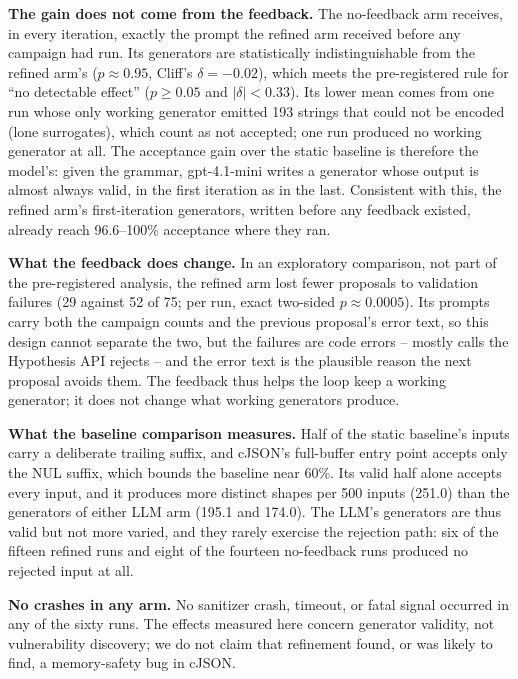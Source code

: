 \textbf{The gain does not come from the feedback.} The no-feedback arm
receives, in every iteration, exactly the prompt the refined arm received
before any campaign had run. Its generators are statistically
indistinguishable from the refined arm's ($p \approx 0.95$, Cliff's
$\delta = -0.02$), which meets the pre-registered rule for ``no detectable
effect'' ($p \geq 0.05$ and $|\delta| < 0.33$). Its lower mean comes from
one run whose only working generator emitted 193 strings that could not be
encoded (lone surrogates), which count as not accepted; one run produced no
working generator at all. The acceptance gain over the static baseline is
therefore the model's: given the grammar, gpt-4.1-mini writes a generator
whose output is almost always valid, in the first iteration as in the last.
Consistent with this, the refined arm's first-iteration generators, written
before any feedback existed, already reach 96.6--100\% acceptance where they
ran.

\textbf{What the feedback does change.} In an exploratory comparison, not
part of the pre-registered analysis, the refined arm lost fewer proposals
to validation failures (29 against 52 of 75; per run, exact two-sided
$p \approx 0.0005$). Its prompts carry both the campaign counts and the
previous proposal's error text, so this design cannot separate the two, but
the failures are code errors -- mostly calls the Hypothesis API rejects --
and the error text is the plausible reason the next proposal avoids them.
The feedback thus helps the loop keep a working generator; it does not
change what working generators produce.

\textbf{What the baseline comparison measures.} Half of the static
baseline's inputs carry a deliberate trailing suffix, and cJSON's
full-buffer entry point accepts only the NUL suffix, which bounds the
baseline near 60\%. Its valid half alone accepts every input, and it
produces more distinct shapes per 500 inputs (251.0) than the generators of
either LLM arm (195.1 and 174.0). The LLM's generators are thus valid but not
more varied, and they rarely exercise the rejection path: six of the
fifteen refined runs and eight of the fourteen no-feedback runs produced no
rejected input at all.

\textbf{No crashes in any arm.} No sanitizer crash, timeout, or fatal
signal occurred in any of the sixty runs. The effects measured here concern
generator validity, not vulnerability discovery; we do not claim that
refinement found, or was likely to find, a memory-safety bug in cJSON.

